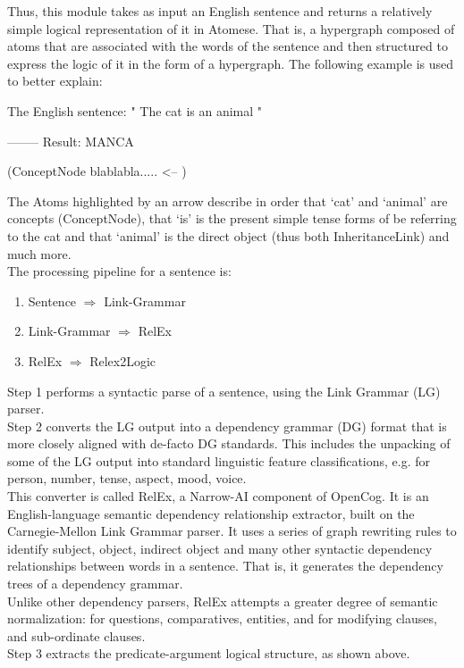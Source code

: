 Thus, this module takes as input an English sentence and returns a relatively simple logical representation of it in Atomese. That is, a hypergraph composed of atoms that are associated with the words of the sentence and then structured to express the logic of it in the form of a hypergraph. The following example is used to better explain: \\
\begin{python}
	The English sentence: " The cat is an animal "

	-------- Result:
	MANCA 

	(ConceptNode blablabla.....	<--
	)
\end{python}
The Atoms highlighted by an arrow describe in order that `cat' and `animal' are concepts (ConceptNode), that `is' is the present simple tense forms of be referring to the cat and that `animal' is the direct object (thus both InheritanceLink) and much more. \\

The processing pipeline for a sentence is: 
\begin{enumerate}
	\item Sentence $\Rightarrow$ Link-Grammar
	\item Link-Grammar $\Rightarrow$ RelEx
	\item RelEx $\Rightarrow$ Relex2Logic
\end{enumerate}

Step 1 performs a syntactic parse of a sentence, using the Link Grammar (LG) parser. \\

Step 2 converts the LG output into a dependency grammar (DG) format that is more closely aligned with de-facto DG standards. This includes the unpacking of some of the LG output into standard linguistic feature classifications, e.g. for person, number, tense, aspect, mood, voice. \\
This converter is called RelEx, a Narrow-AI component of OpenCog. It is an English-language semantic dependency relationship extractor, built on the Carnegie-Mellon Link Grammar parser. It uses a series of graph rewriting rules to identify subject, object, indirect object and many other syntactic dependency relationships between words in a sentence. That is, it generates the dependency trees of a dependency grammar. \\
Unlike other dependency parsers, RelEx attempts a greater degree of semantic normalization: for questions, comparatives, entities, and for modifying clauses, and sub-ordinate clauses. \\

Step 3 extracts the predicate-argument logical structure, as shown above.
